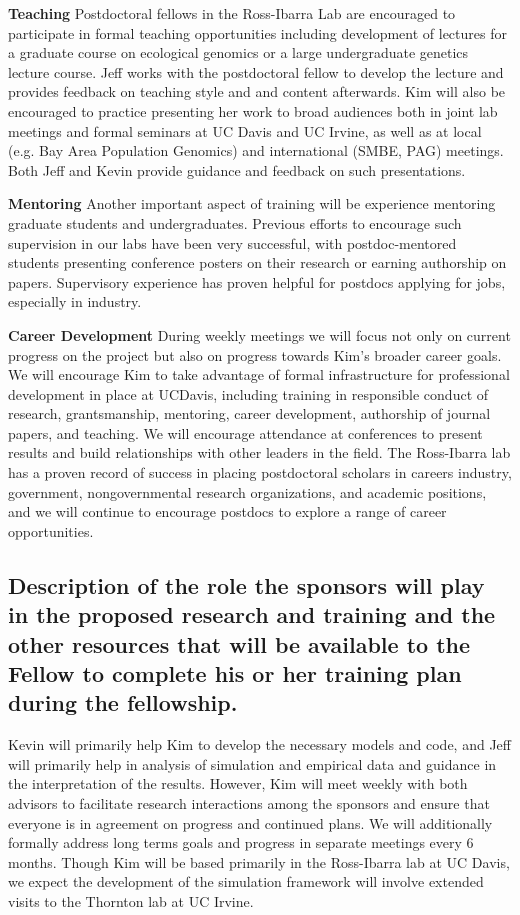 \textbf{Teaching}  Postdoctoral fellows in the Ross-Ibarra Lab are encouraged to participate in formal teaching opportunities including development of lectures for a graduate course on ecological genomics or a large undergraduate genetics lecture course.  Jeff works with the postdoctoral fellow to develop the lecture and provides feedback on teaching style and and content afterwards. Kim will also be encouraged to practice presenting her work to broad audiences both in joint lab meetings and formal seminars at UC Davis and UC Irvine, as well as at local (e.g. Bay Area Population Genomics) and international (SMBE, PAG) meetings. Both Jeff and Kevin provide guidance and feedback on such presentations. 

\textbf{Mentoring}
Another important aspect of training will be experience mentoring graduate students and undergraduates.  Previous efforts to encourage such supervision in our labs have been very successful, with postdoc-mentored students presenting conference posters on their research or earning authorship on papers.  Supervisory experience has proven helpful for postdocs applying for jobs, especially in industry.

\textbf{Career Development}
During weekly  meetings we will focus not only on current progress on the project but also on progress  towards Kim's broader career goals. We will encourage Kim to take advantage of formal infrastructure for professional development in place at UCDavis, including training in responsible conduct of research, grantsmanship, mentoring, career development, authorship of journal papers, and teaching. We will encourage attendance at conferences to present results and build relationships with other leaders in the field. The Ross-Ibarra lab has a proven record of success in placing postdoctoral scholars in careers industry, government, nongovernmental research organizations, and academic positions, and we will continue to encourage postdocs to explore a range of career opportunities.

\subsection{Description of the role the sponsors will play in the proposed research and training and the other resources that will be available to the Fellow to complete his or her training plan during the fellowship.}


Kevin will primarily help Kim to develop the necessary models and code, and Jeff will primarily help in analysis of simulation and empirical data and guidance in the interpretation of the results. 
However, Kim will meet weekly with both advisors to facilitate research interactions among the sponsors and ensure that everyone is in agreement on progress and continued plans.   We will additionally formally address long terms goals and progress in separate meetings every 6 months. Though Kim will be based primarily in the Ross-Ibarra lab at UC Davis, we expect the development of the simulation framework will involve extended visits to the Thornton lab at UC Irvine.

